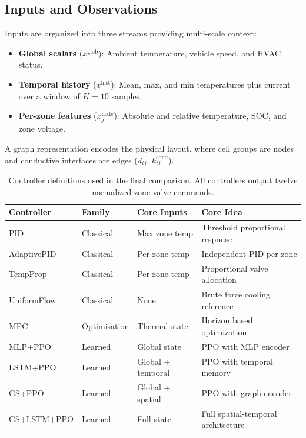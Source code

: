 \documentclass[twocolumn]{article}
\begin{document}
\subsection*{Inputs and Observations}

Inputs are organized into three streams providing multi-scale context:
\begin{itemize}
    \item \textbf{Global scalars} ($x^{\mathrm{glob}}$): Ambient temperature, vehicle speed, and HVAC status.
    \item \textbf{Temporal history} ($x^{\mathrm{hist}}$): Mean, max, and min temperatures plus current over a window of $K=10$ samples.
    \item \textbf{Per-zone features} ($x^{\mathrm{node}}_j$): Absolute and relative temperature, SOC, and zone voltage.
\end{itemize}
A graph representation encodes the physical layout, where cell groups are nodes and conductive interfaces are edges ($d_{ij}$, $k^{\mathrm{cond}}_{ij}$).

\begin{table}[!tb]
\centering
\caption{Controller definitions used in the final comparison. All controllers output twelve normalized zone valve commands.}\label{tab:controllers}
\small
\renewcommand{\arraystretch}{1.2}
\begin{tabular}{lllp{}}
\hline
\textbf{Controller} & \textbf{Family} & \textbf{Core Inputs} & \textbf{Core Idea}\\
\hline
PID & Classical & Max zone temp & Threshold proportional response\\
AdaptivePID & Classical & Per-zone temp & Independent PID per zone\\
TempProp & Classical & Per-zone temp & Proportional valve allocation\\
UniformFlow & Classical & None & Brute force cooling reference\\
MPC & Optimisation & Thermal state & Horizon based optimization\\
MLP+PPO & Learned & Global state & PPO with MLP encoder\\
LSTM+PPO & Learned & Global + temporal & PPO with temporal memory\\
GS+PPO & Learned & Global + spatial & PPO with graph encoder\\
GS+LSTM+PPO & Learned & Full state & Full spatial-temporal architecture\\
\hline
\end{tabular}
\end{table}
\end{document}
